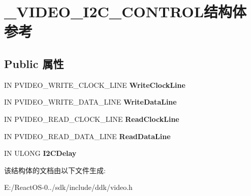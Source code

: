 \hypertarget{struct___v_i_d_e_o___i2_c___c_o_n_t_r_o_l}{}\section{\+\_\+\+V\+I\+D\+E\+O\+\_\+\+I2\+C\+\_\+\+C\+O\+N\+T\+R\+O\+L结构体 参考}
\label{struct___v_i_d_e_o___i2_c___c_o_n_t_r_o_l}
\subsection*{Public 属性}
\begin{DoxyCompactItemize}
\item 
\mbox{\label{struct___v_i_d_e_o___i2_c___c_o_n_t_r_o_l_a9aa37a3c91e0fca0e5e53c5ea489fc35}} 
IN P\+V\+I\+D\+E\+O\+\_\+\+W\+R\+I\+T\+E\+\_\+\+C\+L\+O\+C\+K\+\_\+\+L\+I\+NE {\bfseries Write\+Clock\+Line}
\item 
\mbox{\label{struct___v_i_d_e_o___i2_c___c_o_n_t_r_o_l_ab1986614b7c6883f3df91cc34d68d3f0}} 
IN P\+V\+I\+D\+E\+O\+\_\+\+W\+R\+I\+T\+E\+\_\+\+D\+A\+T\+A\+\_\+\+L\+I\+NE {\bfseries Write\+Data\+Line}
\item 
\mbox{\label{struct___v_i_d_e_o___i2_c___c_o_n_t_r_o_l_ab1a466244138469326882a38b860657d}} 
IN P\+V\+I\+D\+E\+O\+\_\+\+R\+E\+A\+D\+\_\+\+C\+L\+O\+C\+K\+\_\+\+L\+I\+NE {\bfseries Read\+Clock\+Line}
\item 
\mbox{\label{struct___v_i_d_e_o___i2_c___c_o_n_t_r_o_l_a22b07f5eb76f9037c4dfecd05b98aef1}} 
IN P\+V\+I\+D\+E\+O\+\_\+\+R\+E\+A\+D\+\_\+\+D\+A\+T\+A\+\_\+\+L\+I\+NE {\bfseries Read\+Data\+Line}
\item 
\mbox{\label{struct___v_i_d_e_o___i2_c___c_o_n_t_r_o_l_a5801df0d97c190836285a51321c8e259}} 
IN U\+L\+O\+NG {\bfseries I2\+C\+Delay}
\end{DoxyCompactItemize}


该结构体的文档由以下文件生成\+:\begin{DoxyCompactItemize}
\item 
E\+:/\+React\+O\+S-\/0../sdk/include/ddk/video.\+h\end{DoxyCompactItemize}
